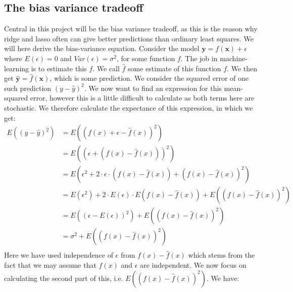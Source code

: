 \documentclass{article}
\begin{document}
\subsection{The bias variance tradeoff}
Central in this project will be the bias variance tradeoff, as this is the reason
why ridge and lasso often can give better predictions than ordinary least
squares. We will here derive the bias-variance equation. Consider the model
$\mathbf{y} = f(\mathbf{x}) + \epsilon$ where $E(\epsilon) = 0$ and
$Var(\epsilon) = \sigma^2$, for some function $f$. The job in machine-learning
is to estimate this $f$. We call $\hat{f}$ some estimate of this function $f$.
We then get $\hat{\mathbf{y}} = \hat{f}(\mathbf{x})$, which is some prediction.
We consider the squared error of one such prediction $(y - \hat{y})^2$. We
now want to find an expression for this mean-squared error, however this is a
little difficult to calculate as both terms here are stochastic. We therefore
calculate the expectance of this expression, in which we get:
\begin{align*}
    E((y - \hat{y})^2) & = E((f(x) + \epsilon - \hat{f}(x))^2)                                                      \\
                       & = E((\epsilon + (f(x) - \hat{f}(x)))^2)                                                    \\
                       & = E(\epsilon^2 + 2\cdot \epsilon \cdot (f(x) - \hat{f}(x)) + (f(x) - \hat{f}(x))^2)        \\
                       & = E(\epsilon^2) + 2\cdot E(\epsilon) \cdot E(f(x) - \hat{f}(x)) + E((f(x) - \hat{f}(x))^2) \\
                       & = E((\epsilon - E(\epsilon))^2) + E((f(x) - \hat{f}(x))^2)                                 \\
                       & = \sigma^2 + E((f(x) - \hat{f}(x))^2)                                                      \\
\end{align*}
Here we have used independence of $\epsilon$ from $f(x) - \hat{f}(x)$ which
stems from the fact that we may assume that $\hat{f}(x)$ and $\epsilon$ are
independent. We now focus on calculating the second part of this, i.e. $E((f(x)
    - \hat{f}(x))^2)$. We have:
\end{document}
